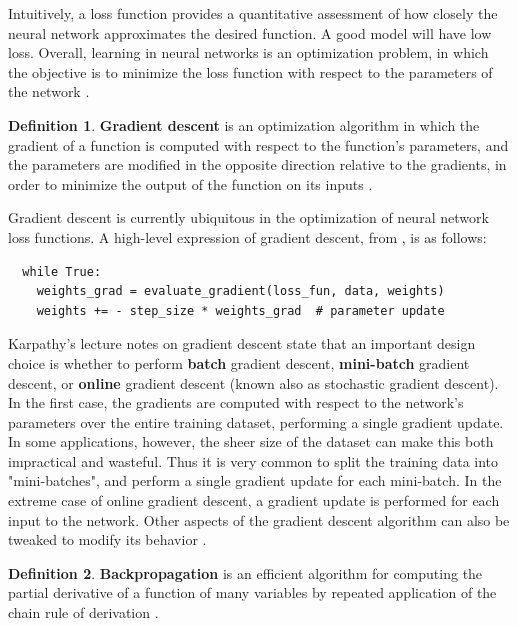 \documentclass[12pt, titlepage]{report}
\theoremstyle{definition}
\newtheorem{definition}{Definition}
\begin{document}
Intuitively, a loss function provides a quantitative assessment of how closely the neural network approximates the desired function. A good model will have low loss. Overall, learning in neural networks is an optimization problem, in which the objective is to minimize the loss function with respect to the parameters of the network \cite[Linear classification: Support Vector Machine, Softmax]{karpathy2017cs231n}.

\begin{definition}
\textbf{Gradient descent} is an optimization algorithm in which the gradient of a function is computed with respect to the function's parameters, and the parameters are modified in the opposite direction relative to the gradients, in order to minimize the output of the function on its inputs \cite{[Optimization: Stochastic Gradient Descent] karpathy2017cs231n}.
\end{definition}

Gradient descent is currently ubiquitous in the optimization of neural network loss functions. A high-level expression of gradient descent, from \cite{karpathy2017cs231n}, is as follows:

\begin{verbatim}
  while True:
    weights_grad = evaluate_gradient(loss_fun, data, weights)
    weights += - step_size * weights_grad  # parameter update
\end{verbatim}

Karpathy's lecture notes on gradient descent state that an important design choice is whether to perform \textbf{batch} gradient descent, \textbf{mini-batch} gradient descent, or \textbf{online} gradient descent (known also as stochastic gradient descent). In the first case, the gradients are computed with respect to the network's parameters over the entire training dataset, performing a single gradient update. In some applications, however, the sheer size of the dataset can make this both impractical and wasteful. Thus it is very common to split the training data into "mini-batches", and perform a single gradient update for each mini-batch. In the extreme case of online gradient descent, a gradient update is performed for each input to the network. Other aspects of the gradient descent algorithm can also be tweaked to modify its behavior \cite[Optimization: Stochastic Gradient Descent]{karpathy2017cs231n}. 

\begin{definition}
\textbf{Backpropagation} is an efficient algorithm for computing the partial derivative of a function of many variables by repeated application of the chain rule of derivation \cite[Backpropagation, Intuitions]{karpathy2017cs231n}. 
\end{definition}
\end{document}
